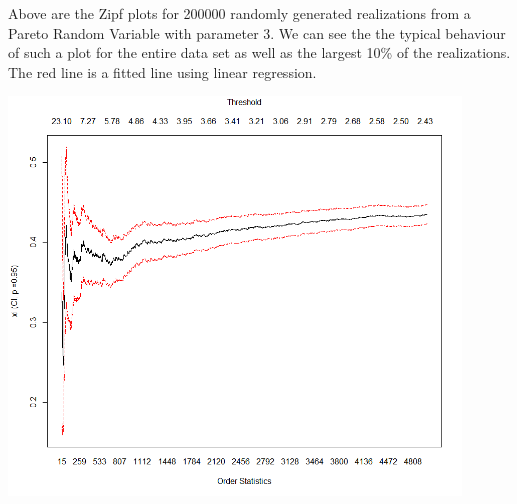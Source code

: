 \documentclass[letterpaper,12pt,titlepage,oneside,final]{book}
\begin{document}
Above are the Zipf plots for 200000 randomly generated realizations from a Pareto Random Variable with parameter 3. We can see the the typical behaviour of such a plot for the entire data set as well as the largest 10\% of the realizations. The red line is a fitted line using linear regression.

\vspace{5mm}

\noindent\begin{minipage}{\textwidth}
	\begin{minipage}{0.45\textwidth}
		\centering
		\includegraphics[width=0.9\textwidth]{ParHill}
	\end{minipage}
	\hfill
	\begin{minipage}[b]{0.45\textwidth}
		\centering
	\label{tab: Pareto Hill} 
	\scriptsize
	\end{minipage}
\end{minipage}
\end{document}
